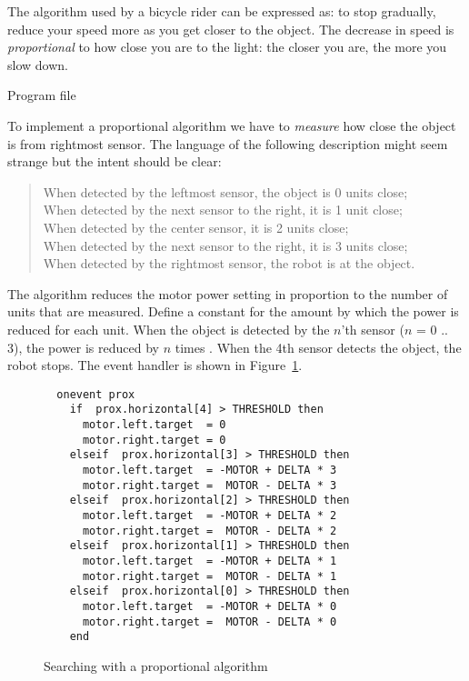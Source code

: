 The algorithm used by a bicycle rider can be expressed as: to
stop gradually, reduce your speed more as you get closer to the
object. The decrease in speed is
\emph{proportional} to how close you are to the light: the closer you
are, the more you slow down.

{\raggedleft \hfill Program file }

To implement a proportional algorithm we have to \emph{measure} how
close the object is from rightmost sensor. The language of the
following description might seem strange but the intent should be clear:

\begin{quote}
When detected by the leftmost sensor, the object is 0 units close;\\
When detected by the next sensor to the right, it is 1 unit close;\\
When detected by the center sensor, it is 2 units close;\\
When detected by the next sensor to the right, it is 3 units close;\\
When detected by the rightmost sensor, the robot is at the object.
\end{quote}

The algorithm reduces the motor power setting in proportion to the
number of units that are measured. Define a constant  for the
amount by which the power is reduced for each unit. When the object is
detected by the $n$'th sensor ($n$ = 0 .. 3), the power is reduced by
$n$ times . When the 4th sensor detects the object, the robot stops.
The event handler is shown in
Figure~\ref{f.pro}.

\begin{figure}
\begin{verbatim}
  onevent prox
    if  prox.horizontal[4] > THRESHOLD then
      motor.left.target  = 0
      motor.right.target = 0
    elseif  prox.horizontal[3] > THRESHOLD then
      motor.left.target  = -MOTOR + DELTA * 3
      motor.right.target =  MOTOR - DELTA * 3
    elseif  prox.horizontal[2] > THRESHOLD then
      motor.left.target  = -MOTOR + DELTA * 2
      motor.right.target =  MOTOR - DELTA * 2
    elseif  prox.horizontal[1] > THRESHOLD then
      motor.left.target  = -MOTOR + DELTA * 1
      motor.right.target =  MOTOR - DELTA * 1
    elseif  prox.horizontal[0] > THRESHOLD then
      motor.left.target  = -MOTOR + DELTA * 0
      motor.right.target =  MOTOR - DELTA * 0
    end
\end{verbatim}
\caption{Searching with a proportional algorithm}\label{f.pro}
\end{figure}

